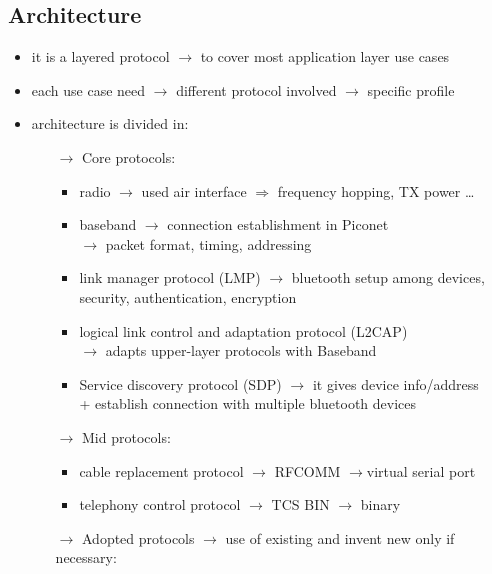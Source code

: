 \subsection{Architecture}
\begin{itemize}
    \item it is a layered protocol $\rightarrow$ to cover most application layer use cases
    \item each use case need $\rightarrow$ different protocol involved $\rightarrow$ specific profile
    \item architecture is divided in:
    \begin{itemize}
        \item[$\rightarrow$] Core protocols:
        \begin{itemize}
            \item radio $\rightarrow$ used air interface $\Rightarrow$ frequency
            hopping, TX power \dots
            \item baseband $\rightarrow$ connection establishment in Piconet\\
            $\rightarrow$ packet format, timing, addressing
            \item link manager protocol (LMP) $\rightarrow$ bluetooth setup among
            devices,\\security, authentication, encryption
            \item logical link control and adaptation protocol (L2CAP)\\
            $\rightarrow$ adapts upper-layer protocols with Baseband
            \item Service discovery protocol (SDP) $\rightarrow$ it gives device info/address\\
            + establish connection with multiple bluetooth devices
        \end{itemize} 
        \item[$\rightarrow$] Mid protocols:
        \begin{itemize}
            \item cable replacement protocol $\rightarrow$ RFCOMM $\rightarrow$virtual serial port
            \item telephony control protocol $\rightarrow$ TCS BIN $\rightarrow$ binary
        \end{itemize}
        \item[$\rightarrow$] Adopted protocols $\rightarrow$ use of existing and invent new only if necessary:
        \begin{itemize}

\end{itemize}
\end{itemize}
\end{itemize}
